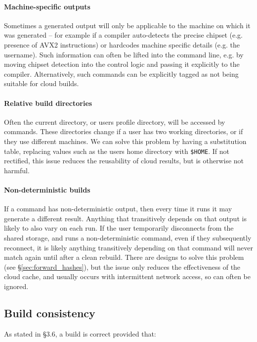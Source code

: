 \paragraph{Machine-specific outputs} Sometimes a generated output will only be applicable to the machine on which it was generated -- for example if a compiler auto-detects the precise chipset (e.g. presence of AVX2 instructions) or hardcodes machine specific details (e.g. the username). Such information can often be lifted into the command line, e.g. by moving chipset detection into the control logic and passing it explicitly to the compiler. Alternatively, such commands can be explicitly tagged as not being suitable for cloud builds.

\paragraph{Relative build directories} Often the current directory, or users profile directory, will be accessed by commands. These directories change if a user has two working directories, or if they use different machines. We can solve this problem by having a substitution table, replacing values such as the users home directory with \texttt{\$HOME}. If not rectified, this issue reduces the reusability of cloud results, but is otherwise not harmful.

\paragraph{Non-deterministic builds} If a command has non-deterministic output, then every time it runs it may generate a different result. Anything that transitively depends on that output is likely to also vary on each run. If the user temporarily disconnects from the shared storage, and runs a non-deterministic command, even if they subsequently reconnect, it is likely anything transitively depending on that command will never match again until after a clean rebuild. There are designs to solve this problem (see \S\ref{sec:forward_hashes}), but the issue only reduces the effectiveness of the cloud cache, and usually occurs with intermittent network access, so can often be ignored.

\subsection{Build consistency}
\label{sec:hazards}

As stated in \citet{build_systems_a_la_carte} \S3.6, a build is correct provided that:

